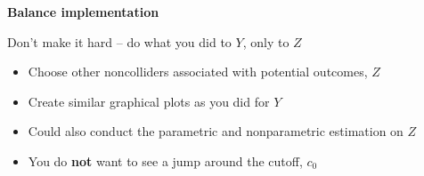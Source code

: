 \documentclass[notes=show]{beamer}
\begin{document}
\begin{frame}[plain]
\begin{center}
\textbf{Balance implementation}
\end{center}


Don't make it hard -- do what you did to $Y$, only to $Z$
		\begin{itemize}
		\item Choose other noncolliders associated with potential outcomes, $Z$ 
		\item Create similar graphical plots as you did for $Y$
		\item Could also conduct the parametric and nonparametric estimation on $Z$
		\item You do \textbf{not} want to see a jump around the cutoff, $c_0$
		\end{itemize}

\end{frame}
\end{document}
